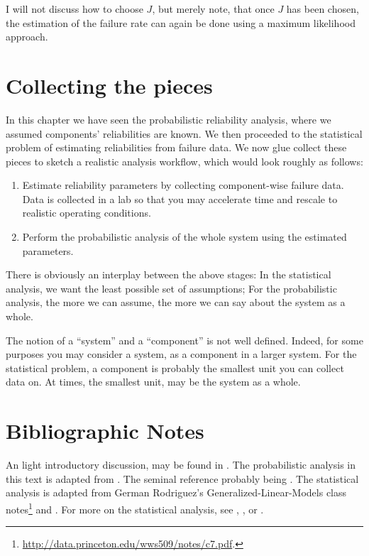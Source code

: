 I will not discuss how to choose $J$, but merely note, that once $J$ has been chosen, the estimation of the failure rate can again be done using a maximum likelihood approach.


\section{Collecting the pieces}
In this chapter we have seen the probabilistic reliability analysis, where we assumed components' reliabilities are known. 
We then proceeded to the statistical problem of estimating reliabilities from failure data.
We now glue collect these pieces to sketch a realistic analysis workflow, which would look roughly as follows:
\begin{enumerate}
\item Estimate reliability parameters by collecting component-wise failure data. Data is collected in a lab so that you may accelerate time and rescale to realistic operating conditions.
\item Perform the probabilistic analysis of the whole system using the estimated parameters.
\end{enumerate}



\begin{remark}
There is obviously an interplay between the above stages:
In the statistical analysis, we want the least possible set of assumptions;
For the probabilistic analysis, the more we can assume, the more we can say about the system as a whole.
\end{remark}



\begin{remark}
The notion of a ``system'' and a ``component'' is not well defined.
Indeed, for some purposes you may consider a system, as a component in a larger system.
For the statistical problem, a component is probably the smallest unit you can collect data on. At times, the smallest unit, may be the system as a whole.
\end{remark}




\section{Bibliographic Notes}
An light introductory discussion, may be found in \cite{nahmias_production_2015}. 
The probabilistic analysis in this text is adapted from \cite{aven_stochastic_1999}.
The seminal reference probably being \cite{barlow_mathematical_1965}.
The statistical analysis is adapted from German Rodriguez's Generalized-Linear-Models class notes\footnote{\url{http://data.princeton.edu/wws509/notes/c7.pdf}.} and \cite[Ch.8]{natrella_nist/sematech_2010}.
For more on the statistical analysis, see \cite{cox_analysis_1984}, \cite{kalbfleisch_statistical_2002}, or \cite{klein_survival_2005}.


% 
